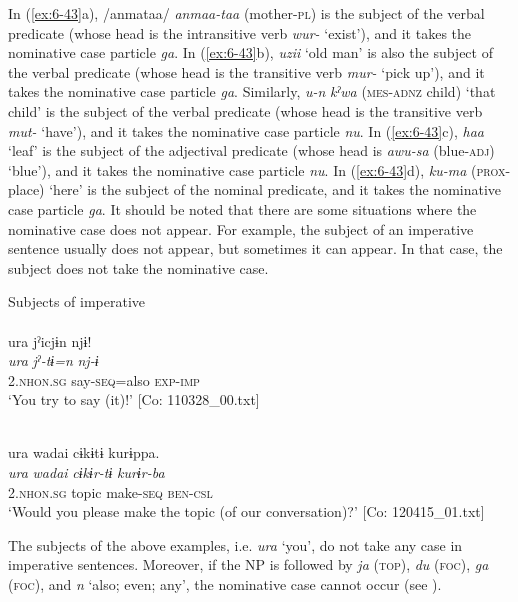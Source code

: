In (\ref{ex:6-43}a), /anmataa/ \textit{anmaa-taa} (mother-\textsc{pl}) is the subject of the verbal predicate (whose head is the intransitive verb \textit{wur-} ‘exist’), and it takes the nominative case particle \textit{ga}. In (\ref{ex:6-43}b), \textit{uzii} ‘old man’ is also the subject of the verbal predicate (whose head is the transitive verb \textit{mur-} ‘pick up’), and it takes the nominative case particle \textit{ga}. Similarly, \textit{u-n} \textit{kˀwa} (\textsc{mes}-\textsc{adnz} child) ‘that child’ is the subject of the verbal predicate (whose head is the transitive verb \textit{mut-} ‘have’), and it takes the nominative case particle \textit{nu}. In (\ref{ex:6-43}c), \textit{haa} ‘leaf’ is the subject of the adjectival predicate (whose head is \textit{awu-sa} (blue-\textsc{adj}) ‘blue’), and it takes the nominative case particle \textit{nu}. In (\ref{ex:6-43}d), \textit{ku-ma} (\textsc{prox}-place) ‘here’ is the subject of the nominal predicate, and it takes the nominative case particle \textit{ga}. It should be noted that there are some situations where the nominative case does not appear. For example, the subject of an imperative sentence usually does not appear, but sometimes it can appear. In that case, the subject does not take the nominative case.

\ea\label{ex:6-44}
 Subjects of imperative\\
 \ea{}\\
{\TM}
\glll  ura  jˀicjɨn  njɨ!\\
\textit{ura}  \textit{jˀ-tɨ=n}  \textit{nj-ɨ}\\
2.\textsc{nhon}.\textsc{sg}  say-\textsc{seq}=also  \textsc{exp}-\textsc{imp}\\
\glt ‘You try to say (it)!’ [Co: 110328\_00.txt]

\ex{}\\
{\TM}
\glll  ura  {\textbar}wadai{\textbar}  cɨkɨtɨ  kurɨppa.\\
\textit{ura}  \textit{wadai}  \textit{cɨkɨr-tɨ}  \textit{kurɨr-ba}\\
2.\textsc{nhon}.\textsc{sg}  topic  make-\textsc{seq}  \textsc{ben}-\textsc{csl}\\
\glt ‘Would you please make the topic (of our conversation)?’ [Co: 120415\_01.txt]
\z
\z

The subjects of the above examples, i.e. \textit{ura} ‘you’, do not take any case in imperative sentences. Moreover, if the NP is followed by \textit{ja} (\textsc{top}), \textit{du} (\textsc{foc}), \textit{ga} (\textsc{foc}), and \textit{n} ‘also; even; any’, the nominative case cannot occur (see ).

